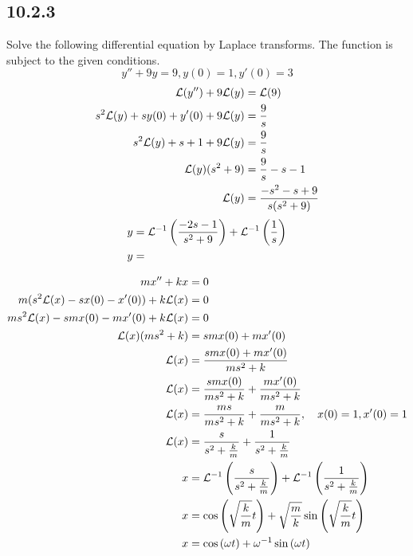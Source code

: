 \documentclass{article}
\begin{document}
\subsection{10.2.3}

Solve the following differential equation by Laplace transforms. The function is subject to the given conditions.
\begin{equation*}
	y'' + 9y = 9, y(0) = 1, y'(0) = 3
\end{equation*}
\begin{align*}
	\mathcal{L}(y'') + 9\mathcal{L}(y) & = \mathcal{L}(9) \\
	s^2\mathcal{L}(y) + sy(0) + y'(0) + 9\mathcal{L}(y) & = \frac{9}{s} \\
	s^2\mathcal{L}(y) + s + 1 + 9\mathcal{L}(y) & = \frac{9}{s} \\
	\mathcal{L}(y)(s^2 + 9) & = \frac{9}{s} - s - 1 \\
	\mathcal{L}(y) & = \frac{-s^2 - s + 9}{s(s^2 + 9)}
\end{align*}
\begin{align*}
	y & = \mathcal{L}^{-1} \left( \frac{-2s - 1}{s^2 + 9} \right) + \mathcal{L}^{-1} \left( \frac{1}{s} \right) \\
	y & = 
\end{align*}

\begin{align*}
	mx'' + kx & = 0 \\
	m(s^2\mathcal{L}(x) - sx(0) - x'(0)) + k\mathcal{L}(x) & = 0 \\
	ms^2\mathcal{L}(x) -smx(0) - mx'(0) + k\mathcal{L}(x) & = 0 \\
	\mathcal{L}(x)(ms^2 + k) & = smx(0) + mx'(0) \\
	\mathcal{L}(x) & = \frac{smx(0) + mx'(0)}{ms^2 + k} \\
	\mathcal{L}(x) & = \frac{smx(0)}{ms^2 + k} + \frac{mx'(0)}{ms^2 + k} \\
	\mathcal{L}(x) & = \frac{ms}{ms^2 + k} + \frac{m}{ms^2 + k}, \quad x(0) = 1, x'(0) = 1 \\
	\mathcal{L}(x) & = \frac{s}{s^2 + \frac{k}{m}} + \frac{1}{s^2 + \frac{k}{m}} \\
	x & = \mathcal{L}^{-1} \left( \frac{s}{s^2 + \frac{k}{m}} \right) + \mathcal{L}^{-1} \left( \frac{1}{s^2 + \frac{k}{m}} \right) \\
	x & = \cos \left( \sqrt{ \frac{k}{m} }t \right) + \sqrt{ \frac{m}{k} }\sin \left( \sqrt{ \frac{k}{m} }t \right) \\
	x & = \cos \left( \omega t \right) + \omega^{-1} \sin \left( \omega t \right) \\
\end{align*}
\end{document}
